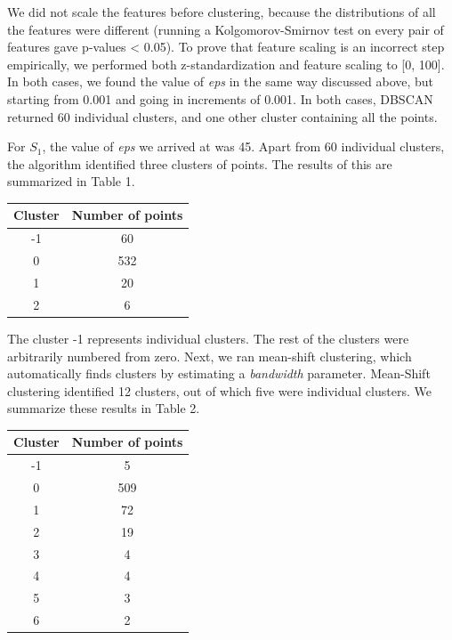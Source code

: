 \documentclass[12pt,a4paper,twocolumn]{article}
\begin{document}
We did not scale the features before clustering, because the distributions of all the features were different (running a Kolgomorov-Smirnov test on every pair of features gave p-values < 0.05). To prove that feature scaling is an incorrect step empirically, we performed both z-standardization and feature scaling to [0, 100]. In both cases, we found the value of \textit{eps} in the same way discussed above, but starting from 0.001 and going in increments of 0.001. In both cases, DBSCAN returned 60 individual clusters, and one other cluster containing all the points.

For $S_1$, the value of \textit{eps} we arrived at was 45. Apart from 60 individual clusters, the algorithm identified three clusters of points. The results of this are summarized in Table 1. \\

\begin{tabular}{|c|c|}
\hline 
\textbf{Cluster} & \textbf{Number of points} \\ 
\hline 
-1 & 60 \\ 
\hline 
0 & 532 \\ 
\hline 
1 & 20 \\ 
\hline 
2 & 6 \\ 
\hline 
\end{tabular}
\begingroup
{}
\endgroup
\hfill\break

The cluster -1 represents individual clusters. The rest of the clusters were arbitrarily numbered from zero. Next, we ran mean-shift clustering, which automatically finds clusters by estimating a \textit{bandwidth} parameter. Mean-Shift clustering identified 12 clusters, out of which five were individual clusters. We summarize these results in Table 2.\\

\begin{tabular}{|c|c|}
\hline 
\textbf{Cluster} & \textbf{Number of points} \\ 
\hline 
-1 & 5 \\ 
\hline 
0 & 509 \\ 
\hline 
1 & 72 \\ 
\hline 
2 & 19 \\ 
\hline 
3 & 4 \\ 
\hline 
4 & 4 \\ 
\hline 
5 & 3 \\ 
\hline 
6 & 2 \\ 
\hline 
\end{tabular}
\begingroup
{}
\endgroup
\hfill\break
\end{document}
